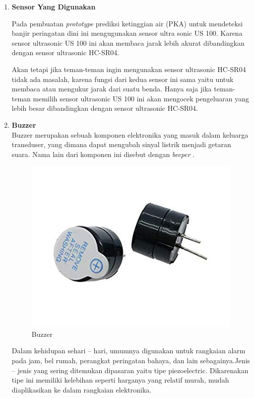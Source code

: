 \begin{enumerate}
\item \textbf{Sensor Yang Digunakan}\\
\par Pada pembuatan \textit{prototype} prediksi ketinggian air (PKA) untuk mendeteksi banjir peringatan dini ini mengugunakan sensor ultra sonic US 100. Karena sensor ultrasonic US 100 ini akan membaca jarak lebih akurat dibandingkan dengan sensor ultrasonic HC-SR04.

\par Akan tetapi jika teman-teman ingin mengunakan sensor ultrasonic HC-SR04 tidak ada masalah, karena fungsi dari kedua sensor ini sama yaitu untuk membaca atau mengukur jarak dari suatu benda. Hanya saja jika teman-teman memilih sensor ultrasonic US 100 ini akan mengocek pengeluaran yang lebih besar dibandingkan dengan sensor ultrasonic HC-SR04.

\item \textbf{Buzzer}\\
Buzzer merupakan sebuah komponen elektronika yang masuk dalam keluarga transduser, yang dimana dapat mengubah sinyal listrik menjadi getaran suara. Nama lain dari komponen ini disebut dengan \textit{beeper} .
\begin{figure}[H]
\centering
\includegraphics[width=1\textwidth]{figures/buzzer.jpg}
\caption{Buzzer}
\label{print}
\end{figure}

Dalam kehidupan sehari – hari, umumnya digunakan untuk rangkaian alarm pada jam, bel rumah, perangkat peringatan bahaya, dan lain sebagainya.Jenis – jenis yang sering ditemukan dipasaran yaitu tipe piezoelectric. Dikarenakan tipe ini memiliki kelebihan seperti harganya yang relatif murah, mudah diaplikasikan ke dalam rangkaian elektronika.


\end{enumerate}
